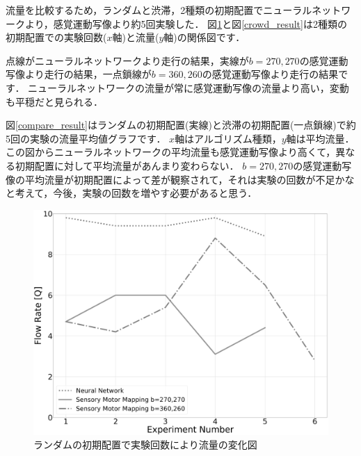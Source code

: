 流量を比較するため，ランダムと渋滞，2種類の初期配置でニューラルネットワークより，感覚運動写像より約5回実験した．
図\ref{random_result}と図\ref{crowd_result}は2種類の初期配置での実験回数($x$軸)と流量($y$軸)の関係図です．

点線がニューラルネットワークより走行の結果，実線が$b=270,270$の感覚運動写像より走行の結果，一点鎖線が$b=360,260$の感覚運動写像より走行の結果です．
ニューラルネットワークの流量が常に感覚運動写像の流量より高い，変動も平穏だと見られる．

図\ref{compare_result}はランダムの初期配置(実線)と渋滞の初期配置(一点鎖線)で約5回の実験の流量平均値グラフです．
$x$軸はアルゴリズム種類，$y$軸は平均流量．この図からニューラルネットワークの平均流量も感覚運動写像より高くて，異なる初期配置に対して平均流量があんまり変わらない．
$b=270,270$の感覚運動写像の平均流量が初期配置によって差が観察されて，それは実験の回数が不足かなと考えて，今後，実験の回数を増やす必要があると思う．


\vspace{-1mm}
\begin{figure}[!ht]
    \centering
    \includegraphics[width=0.9\linewidth]{result_diagrim_rand.eps}
    \caption{ランダムの初期配置で実験回数により流量の変化図}
    \label{random_result}
\end{figure}


